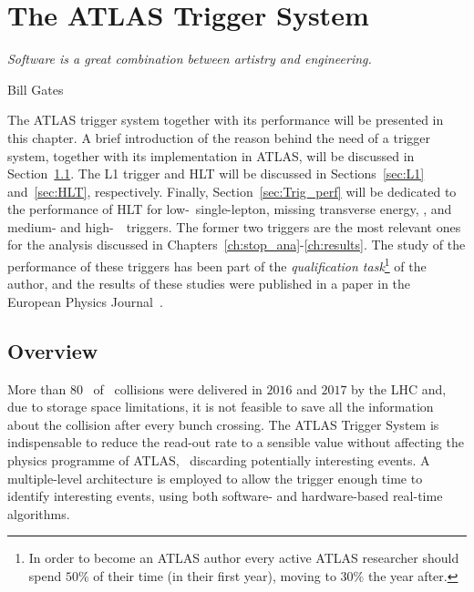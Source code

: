 \chapter{The ATLAS Trigger System}
\label{ch:trigger}
\epigraph{\emph{Software is a great combination between artistry and engineering.}}{Bill Gates}

	The \ac{ATLAS} trigger system together with its performance will be presented in this chapter. A brief introduction of the reason behind the need of a trigger system, together with its implementation in \ac{ATLAS}, will be discussed in Section~\ref{sec:Trig_intro}. The \ac{L1} trigger and \ac{HLT} will be discussed in Sections~\ref{sec:L1} and~\ref{sec:HLT}, respectively. Finally, Section~\ref{sec:Trig_perf} will be dedicated to the performance of \ac{HLT} for low-\pt\ single-lepton, missing transverse energy, \met, and medium- and high-\pt\ \bj\ triggers. The former two triggers are the most relevant ones for the analysis discussed in Chapters~\ref{ch:stop_ana}-\ref{ch:results}. The study of the performance of these triggers has been part of the \textit{qualification task}\footnote{In order to become an \ac{ATLAS} author every active \ac{ATLAS} researcher should spend $50\%$ of their time (in their first year), moving to $30\%$ the year after.} of the author, and the results of these studies were published in a paper in the European Physics Journal~\cite{ATLASTrigger2015}.


	\section{Overview}
	\label{sec:Trig_intro}

		More than 80 \ifb\ of \pp\ collisions were delivered in $2016$ and $2017$ by the \ac{LHC} and, due to storage space limitations, it is not feasible to save all the information about the collision after every bunch crossing. The \ac{ATLAS} Trigger System is indispensable to reduce the read-out rate to a sensible value without affecting the physics programme of \ac{ATLAS}, \eg\ discarding potentially interesting events. A multiple-level architecture is employed to allow the trigger enough time to identify interesting events, using both software- and hardware-based real-time algorithms. 

